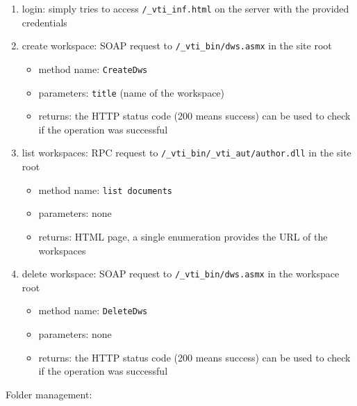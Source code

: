 \begin{enumerate}
\item login: simply tries to access \texttt{/\_vti\_inf.html} on the server with the provided credentials

\item create workspace: SOAP request to \texttt{/\_vti\_bin/dws.asmx} in the site root
\begin{itemize}
\item method name: \texttt{CreateDws}
\item parameters: \texttt{title} (name of the workspace)
\item returns: the HTTP status code (200 means success) can be used to check if the operation was successful
\end{itemize}

\item list workspaces: RPC request to \texttt{/\_vti\_bin/\_vti\_aut/author.dll} in the site root
\begin{itemize}
\item method name: \texttt{list documents}
\item parameters: none
\item returns: HTML page, a single enumeration provides the URL of the workspaces
\end{itemize}

\item delete workspace: SOAP request to \texttt{/\_vti\_bin/dws.asmx} in the workspace root
\begin{itemize}
\item method name: \texttt{DeleteDws}
\item parameters: none
\item returns: the HTTP status code (200 means success) can be used to check if the operation was successful
\end{itemize}
\end{enumerate}

Folder management:

